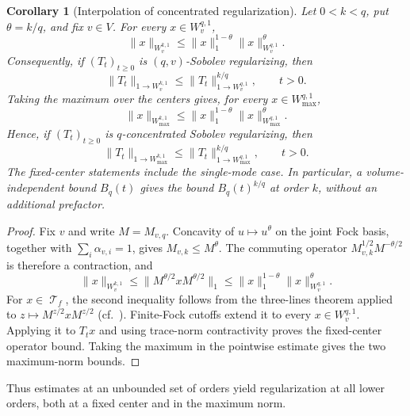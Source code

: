 \documentclass[11pt]{article}
\theoremstyle{myplain}
\newtheorem{cor}[cor]{Corollary}
\theoremstyle{mydefinition}
\theoremstyle{remark}
\DeclareMathOperator{\cT}{\mathcal{T}}
\DeclareMathOperator{\1}{\mathds{1}}
\begin{document}
        
        \begin{cor}[Interpolation of concentrated regularization]
            \label{cor:concentrated-regularization-interpolation} Let $0<k<q$, put $\theta=k/q$, and fix $v\in V$. For every $x\in W_v^{q,1}$,
            \begin{equation}\label{eq:fixed-center-concentrated-norm-interpolation}
                \|x\|_{W_v^{k,1}}
                \leq\|x\|_1^{1-\theta}
                \|x\|_{W_v^{q,1}}^\theta.
            \end{equation}
            Consequently, if $(T_t)_{t\geq0}$ is $(q,v)$-Sobolev regularizing, then
            \begin{equation}\label{eq:fixed-center-concentrated-regularization-interpolation}
                \|T_t\|_{1\to W_v^{k,1}}
                \leq\|T_t\|_{1\to W_v^{q,1}}^{k/q},
                \qquad t>0.
            \end{equation}
            Taking the maximum over the centers gives, for every $x\in W_{\max}^{q,1}$,
            \begin{equation}\label{eq:concentrated-norm-interpolation}
                \|x\|_{W_{\max}^{k,1}}
                \leq\|x\|_1^{1-\theta}
                \|x\|_{W_{\max}^{q,1}}^\theta.
            \end{equation}
            Hence, if $(T_t)_{t\geq0}$ is $q$-concentrated Sobolev regularizing, then
            \begin{equation}\label{eq:concentrated-regularization-interpolation}
                \|T_t\|_{1\to W_{\max}^{k,1}}
                \leq\|T_t\|_{1\to W_{\max}^{q,1}}^{k/q},
                \qquad t>0.
            \end{equation}
            The fixed-center statements include the single-mode case. In particular, a volume-independent bound $B_q(t)$ gives the bound $B_q(t)^{k/q}$ at order $k$, without an additional prefactor.
        \end{cor}
        \begin{proof}
            Fix $v$ and write $M=M_{v,q}$. Concavity of $u\mapsto u^\theta$ on the joint Fock basis, together with $\sum_i\alpha_{v,i}=1$, gives $M_{v,k}\leq M^\theta$. The commuting operator $M_{v,k}^{1/2}M^{-\theta/2}$ is therefore a contraction, and
            \begin{equation*}
                \|x\|_{W_v^{k,1}}
                \leq\|M^{\theta/2}xM^{\theta/2}\|_1
                \leq\|x\|_1^{1-\theta}\|x\|_{W_v^{q,1}}^\theta.
            \end{equation*}
            For $x\in\cT_f$, the second inequality follows from the three-lines theorem applied to $z\mapsto M^{z/2}xM^{z/2}$ (cf.~\cite[Thm.~2.14]{Gondolf.2024}). Finite-Fock cutoffs extend it to every $x\in W_v^{q,1}$. Applying it to $T_tx$ and using trace-norm contractivity proves the fixed-center operator bound. Taking the maximum in the pointwise estimate gives the two maximum-norm bounds.
        \end{proof}
        Thus estimates at an unbounded set of orders yield regularization at all lower orders, both at a fixed center and in the maximum norm.
        
\end{document}
